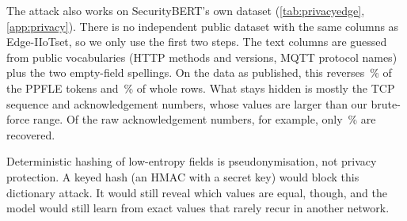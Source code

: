 The attack also works on SecurityBERT's own dataset (\cref{tab:privacyedge}, \cref{app:privacy}). There is no independent public dataset
with the same columns as Edge-IIoTset, so we only use the first two steps. The text columns are guessed from public
vocabularies (HTTP methods and versions, MQTT protocol names) plus the two empty-field spellings. On the data as
published, this reverses \,\% of the PPFLE tokens
and \,\% of whole rows. What stays hidden is mostly
the TCP sequence and acknowledgement numbers, whose values are larger than our brute-force range. Of the raw
acknowledgement numbers, for example, only \,\% are recovered.

Deterministic hashing of low-entropy fields is pseudonymisation, not privacy protection. A keyed hash (an HMAC with a
secret key) would block this dictionary attack. It would still reveal which values are equal, though, and the model
would still learn from exact values that rarely recur in another network.
